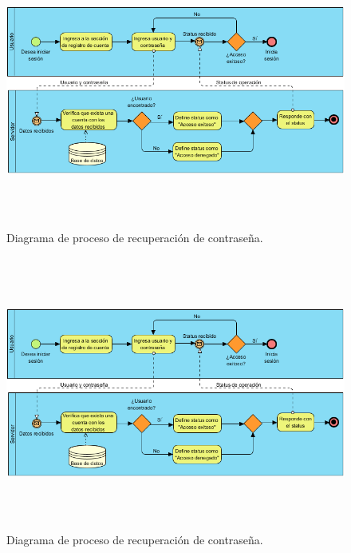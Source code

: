 \begin{figure}[h!]
	\centering
	\includegraphics[width=15cm,height=9cm]{imagenes/desarrollo/diagramas/BPMN_LOGIN.png}
	\caption{Diagrama de proceso de recuperación de contraseña.}
	\label{fig:recover}
\end{figure}
\begin{figure}[h!]
	\centering
	\includegraphics[width=15cm,height=9cm]{imagenes/desarrollo/diagramas/BPMN_LOGIN.png}
	\caption{Diagrama de proceso de recuperación de contraseña.}
	\label{fig:recover}
\end{figure}
